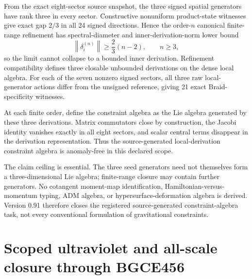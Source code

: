\documentclass[11pt]{article}
\theoremstyle{definition}
\theoremstyle{remark}
\begin{document}
From the exact eight-sector source snapshot, the three signed spatial generators have rank three in every sector. Constructive nonuniform product-state witnesses give exact gap $2/3$ in all 24 signed directions. Hence the order-$n$ canonical finite-range refinement has spectral-diameter and inner-derivation-norm lower bound
\begin{equation}
 \left\lVert\delta_i^{(n)}\right\rVert\ge\frac23(n-2),
 \qquad n\ge3,
\end{equation}
so the limit cannot collapse to a bounded inner derivation. Refinement compatibility defines three closable unbounded derivations on the dense local algebra. For each of the seven nonzero signed sectors, all three raw local-generator actions differ from the unsigned reference, giving 21 exact Braid-specificity witnesses.

At each finite order, define the constraint algebra as the Lie algebra generated by these three derivations. Matrix commutators close by construction, the Jacobi identity vanishes exactly in all eight sectors, and scalar central terms disappear in the derivation representation. Thus the source-generated local-derivation constraint algebra is anomaly-free in this declared scope.

The claim ceiling is essential. The three seed generators need not themselves form a three-dimensional Lie algebra; finite-range closure may contain further generators. No cotangent moment-map identification, Hamiltonian-versus-momentum typing, ADM algebra, or hypersurface-deformation algebra is derived. Version 0.91 therefore closes the registered source-generated constraint-algebra task, not every conventional formulation of gravitational constraints.

\section{Scoped ultraviolet and all-scale closure through BGCE456}\label{sec:uv09}
\end{document}

